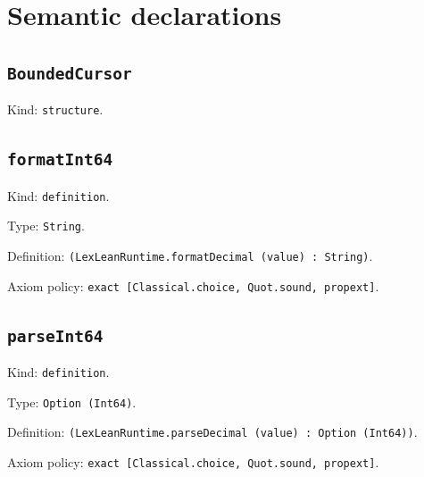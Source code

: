 \documentclass[11pt]{article}
\begin{document}
\section*{Semantic declarations}
\subsection*{\texttt{BoundedCursor}}
\noindent Kind: \texttt{structure}.\par
\subsection*{\texttt{formatInt64}}
\noindent Kind: \texttt{definition}.\par
\noindent Type: \texttt{String}.\par
\noindent Definition: \texttt{(LexLeanRuntime.formatDecimal (value) : String)}.\par
\noindent Axiom policy: \texttt{exact [Classical.choice, Quot.sound, propext]}.\par
\subsection*{\texttt{parseInt64}}
\noindent Kind: \texttt{definition}.\par
\noindent Type: \texttt{Option (Int64)}.\par
\noindent Definition: \texttt{(LexLeanRuntime.parseDecimal (value) : Option (Int64))}.\par
\noindent Axiom policy: \texttt{exact [Classical.choice, Quot.sound, propext]}.\par
\end{document}
